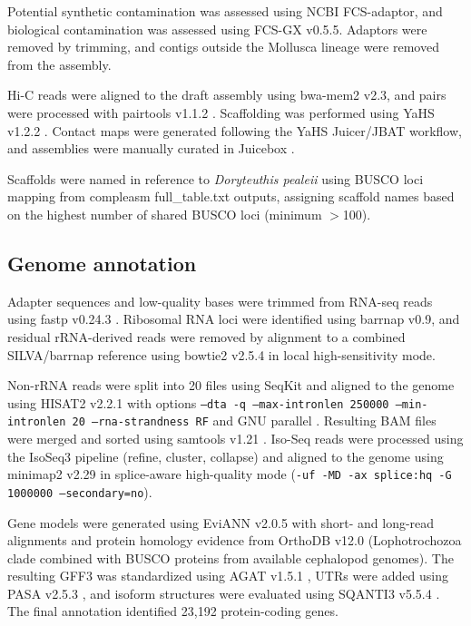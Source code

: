 \documentclass[12pt]{article}
\newcommand{\citep}{\parencite}
\begin{document}
Potential synthetic contamination was assessed using NCBI FCS-adaptor,
and biological contamination was assessed using FCS-GX v0.5.5.
Adaptors were removed by trimming,
and contigs outside the Mollusca lineage were removed from the assembly.

Hi-C reads were aligned to the draft assembly using bwa-mem2 v2.3,
and pairs were processed with pairtools v1.1.2 \citep{Open2C2024Pairtools}.
Scaffolding was performed using YaHS v1.2.2 \citep{Zhou2023YaHS}.
Contact maps were generated following the YaHS Juicer/JBAT workflow,
and assemblies were manually curated in Juicebox \citep{Durand2016Juicebox}.

Scaffolds were named in reference to \textit{Doryteuthis pealeii}
using BUSCO loci mapping from compleasm full\_table.txt outputs,
assigning scaffold names based on the highest number of shared BUSCO loci (minimum $>$100).

\subsection*{Genome annotation}

Adapter sequences and low-quality bases were trimmed from RNA-seq reads
using fastp v0.24.3 \citep{Chenfastp}.
Ribosomal RNA loci were identified using barrnap v0.9,
and residual rRNA-derived reads were removed by alignment
to a combined SILVA/barrnap reference
using bowtie2 v2.5.4 \citep{Langmeadbt2} in local high-sensitivity mode.

Non-rRNA reads were split into 20 files using SeqKit \citep{Shen2016SeqKit}
and aligned to the genome using HISAT2 v2.2.1 \citep{Kim2019HISAT2}
with options \texttt{--dta -q --max-intronlen 250000 --min-intronlen 20 --rna-strandness RF}
and GNU parallel \citep{Tange2018Parallel}.
Resulting BAM files were merged and sorted using samtools v1.21 \citep{Danecek2021SAMtools}.
Iso-Seq reads were processed using the IsoSeq3 pipeline (refine, cluster, collapse)
and aligned to the genome using minimap2 v2.29 \citep{Li2018}
in splice-aware high-quality mode
(\texttt{-uf -MD -ax splice:hq -G 1000000 --secondary=no}).

Gene models were generated using EviANN v2.0.5 \citep{Petersen2025EviAnn}
with short- and long-read alignments and protein homology evidence
from OrthoDB v12.0 (Lophotrochozoa clade combined with BUSCO proteins
from available cephalopod genomes).
The resulting GFF3 was standardized using AGAT v1.5.1 \citep{DainatAGATZenodo},
UTRs were added using PASA v2.5.3 \citep{Haas2003PASA},
and isoform structures were evaluated using SQANTI3 v5.5.4 \citep{Tardaguila2018SQANTI}.
The final annotation identified 23,192 protein-coding genes.
\end{document}
